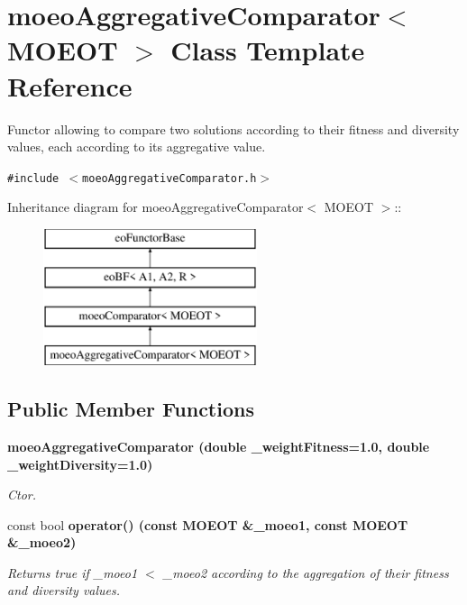 \section{moeo\-Aggregative\-Comparator$<$ MOEOT $>$ Class Template Reference}
\label{classmoeoAggregativeComparator}
Functor allowing to compare two solutions according to their fitness and diversity values, each according to its aggregative value.  


{\tt \#include $<$moeo\-Aggregative\-Comparator.h$>$}

Inheritance diagram for moeo\-Aggregative\-Comparator$<$ MOEOT $>$::\begin{figure}[H]
\begin{center}
\leavevmode
\includegraphics[height=4cm]{classmoeoAggregativeComparator}
\end{center}
\end{figure}
\subsection*{Public Member Functions}
\begin{CompactItemize}
\item 
\bf{moeo\-Aggregative\-Comparator} (double \_\-weight\-Fitness=1.0, double \_\-weight\-Diversity=1.0)
\begin{CompactList}\small\item\em Ctor. \item\end{CompactList}\item 
const bool \bf{operator()} (const MOEOT \&\_\-moeo1, const MOEOT \&\_\-moeo2)
\begin{CompactList}\small\item\em Returns true if \_\-moeo1 $<$ \_\-moeo2 according to the aggregation of their fitness and diversity values. \item\end{CompactList}\end{CompactItemize}
